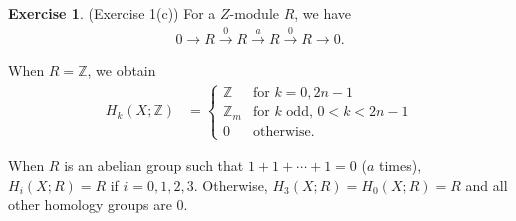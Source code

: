 \documentclass[12pt, psamsfonts]{amsart}
\theoremstyle{definition}
\newtheorem*{exer}{Exercise}
\theoremstyle{remark}
\numberwithin{equation}{section}
\begin{document}
\begin{exer}{(Exercise 1(c))}
  For a $Z$-module $R$, we have
  \begin{align*}
    0 \rightarrow R \xrightarrow{0} R \xrightarrow{a} R \xrightarrow{0} R \rightarrow 0.
  \end{align*}

  When $R = \mathbb{Z}$, we obtain
  \begin{align*}
    H_k(X; \mathbb{Z}) &= \begin{cases}
      \mathbb{Z} & \text{for $k = 0, 2n - 1$} \\
      \mathbb{Z}_m & \text{for $k$ odd, $0 < k < 2n - 1$} \\
      0 & \text{otherwise}.
    \end{cases}
  \end{align*}

  When $R$ is an abelian group such that $1 + 1 + \cdots + 1 = 0$ ($a$ times), $H_i(X; R) = R$ if $i = 0, 1, 2, 3$.
  Otherwise, $H_3(X; R) = H_0(X; R) = R$ and all other homology groups are 0.
\end{exer}
\end{document}
